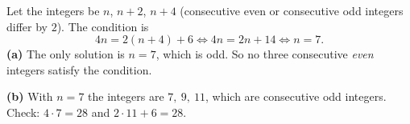 Let the integers be $n$, $n+2$, $n+4$ (consecutive even or consecutive odd integers differ by $2$). The condition is
\[
4n=2(n+4)+6\iff 4n=2n+14\iff n=7 .
\]
\textbf{(a)} The only solution is $n=7$, which is odd. So no three consecutive \emph{even} integers satisfy the condition.

\textbf{(b)} With $n=7$ the integers are $\boxed{7,\ 9,\ 11}$, which are consecutive odd integers. Check: $4\cdot7=28$ and $2\cdot11+6=28$.
